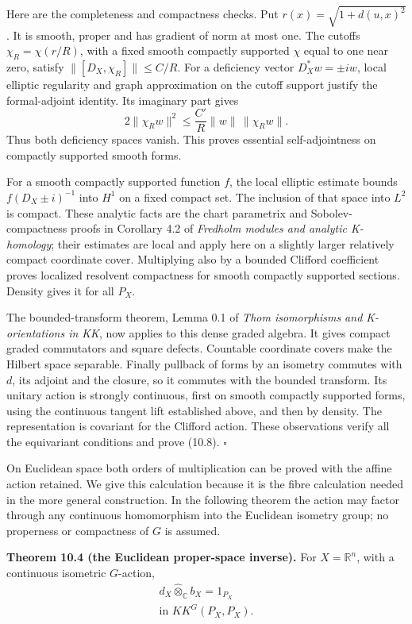 \documentclass[
  11pt,
]{article}
\begin{document}
Here are the completeness and compactness checks. Put
\(r(x)=\sqrt{1+d(u,x)^2}\). It is smooth, proper and has gradient of
norm at most one. The cutoffs \(\chi_R=\chi(r/R)\), with a fixed smooth
compactly supported \(\chi\) equal to one near zero, satisfy
\(\|[D_X,\chi_R]\|\leq C/R\). For a deficiency vector \(D_X^*w=\pm iw\),
local elliptic regularity and graph approximation on the cutoff support
justify the formal-adjoint identity. Its imaginary part gives \[
2\|\chi_Rw\|^2
\leq \frac{C'}R\|w\|\,\|\chi_Rw\|.
\tag{10.9}
\] Thus both deficiency spaces vanish. This proves essential
self-adjointness on compactly supported smooth forms.

For a smooth compactly supported function \(f\), the local elliptic
estimate bounds \(f(D_X\pm i)^{-1}\) into \(H^1\) on a fixed compact
set. The inclusion of that space into \(L^2\) is compact. These analytic
facts are the chart parametrix and Sobolev-compactness proofs in
Corollary 4.2 of \emph{Fredholm modules and analytic K-homology}; their
estimates are local and apply here on a slightly larger relatively
compact coordinate cover. Multiplying also by a bounded Clifford
coefficient proves localized resolvent compactness for smooth compactly
supported sections. Density gives it for all \(P_X\).

The bounded-transform theorem, Lemma 0.1 of \emph{Thom isomorphisms and
K-orientations in KK}, now applies to this dense graded algebra. It
gives compact graded commutators and square defects. Countable
coordinate covers make the Hilbert space separable. Finally pullback of
forms by an isometry commutes with \(d\), its adjoint and the closure,
so it commutes with the bounded transform. Its unitary action is
strongly continuous, first on smooth compactly supported forms, using
the continuous tangent lift established above, and then by density. The
representation is covariant for the Clifford action. These observations
verify all the equivariant conditions and prove (10.8). \(\square\)

On Euclidean space both orders of multiplication can be proved with the
affine action retained. We give this calculation because it is the fibre
calculation needed in the more general construction. In the following
theorem the action may factor through any continuous homomorphism into
the Euclidean isometry group; no properness or compactness of \(G\) is
assumed.

\textbf{Theorem 10.4 (the Euclidean proper-space inverse).} For
\(X=\mathbb R^n\), with a continuous isometric \(G\)-action, \[
\begin{gathered}
d_X\widehat\otimes_{\mathbb C}b_X=1_{P_X}\\
\text{in }KK^G(P_X,P_X).
\end{gathered}
\tag{10.10}
\]
\end{document}
